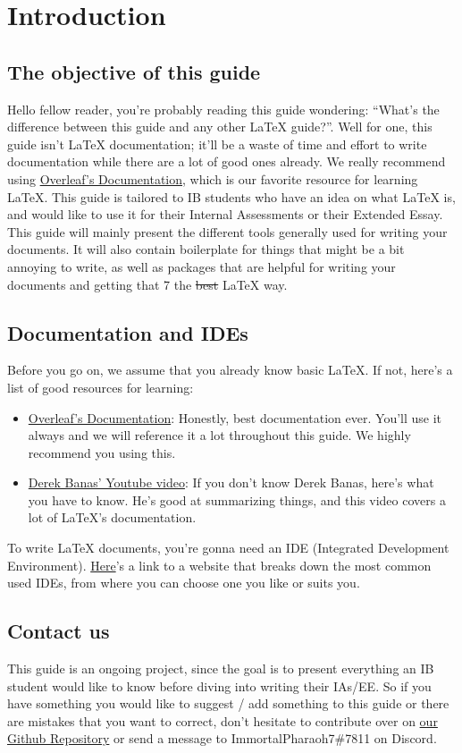 \section{Introduction}
\subsection{The objective of this guide}
Hello fellow reader, you're probably reading this guide wondering:
``What's the difference between this guide and any other \LaTeX{} guide?''.
Well for one, this guide isn't \LaTeX{} documentation;
it'll be a waste of time and effort to write documentation while there are a lot of good ones already.
We really recommend using \href{https://www.overleaf.com/learn/latex/Main_Page}{Overleaf's Documentation},
which is our favorite resource for learning \LaTeX{}.
This guide is tailored to IB students who have an idea on what \LaTeX{} is,
and would like to use it for their Internal Assessments or their Extended Essay.
This guide will mainly present the different tools generally used for writing your documents.
It will also contain boilerplate for things that might be a bit annoying to write,
as well as packages that are helpful for writing your documents and getting that 7 the \sout{best} \LaTeX{} way.

\subsection{Documentation and IDEs}
Before you go on, we assume that you already know basic \LaTeX{}.
If not, here's a list of good resources for learning:
\begin{itemize}
\item \href{https://www.overleaf.com/learn/latex/Main_Page}{Overleaf's Documentation}:
Honestly, best documentation ever.
You'll use it always and we will reference it a lot throughout this guide.
We highly recommend you using this.
\item \href{https://www.youtube.com/watch?v=VhmkLrOjLsw}{Derek Banas' Youtube video}:
If you don't know Derek Banas, here's what you have to know.
He's good at summarizing things, and this video covers a lot of \LaTeX{}'s documentation.
\end{itemize}

To write \LaTeX{} documents, you're gonna need an IDE (Integrated Development Environment).
\href{https://beebom.com/best-latex-editors/}{Here}'s a link to a website that breaks down the most common used IDEs,
from where you can choose one you like or suits you.

\subsection{Contact us}
This guide is an ongoing project,
since the goal is to present everything an IB student would like to know before diving into writing their IAs/EE.
So if you have something you would like to suggest / add something to this guide
or there are mistakes that you want to correct,
don't hesitate to contribute over on \href{https://github.com/ImmortalPharaoh7/Latex-For-The-IB}{our Github Repository}
or send a message to ImmortalPharaoh7\#7811 on Discord.